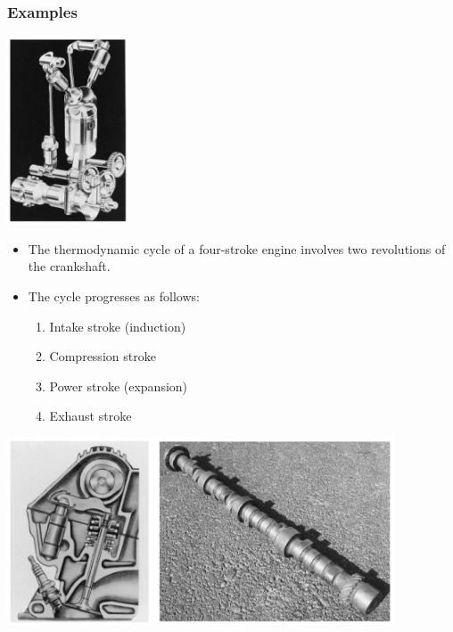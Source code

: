 \documentclass[11pt]{article}
\begin{document}
\subsubsection{Examples}
\label{sec:orgff8b0e0}
\begin{center}
\includegraphics[height=15em]{./images/four-stroke-engine.png}
\end{center}
\begin{itemize}
\item The thermodynamic cycle of a four-stroke engine involves two revolutions of the crankshaft.
\item The cycle progresses as follows:
\begin{enumerate}
\item Intake stroke (induction)
\item Compression stroke
\item Power stroke (expansion)
\item Exhaust stroke
\end{enumerate}
\end{itemize}

\begin{center}
\includegraphics[height=15em]{./images/engine-cross-section.png}
\includegraphics[height=15em]{./images/camshaft.png}
\end{center}
\end{document}
